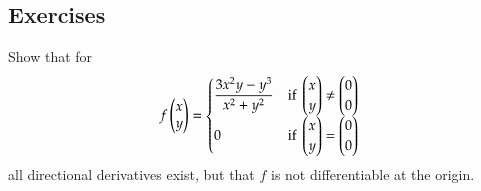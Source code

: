 \subsection{Exercises}
  Show that for
  \[f\begin{pmatrix} x \\ y \end{pmatrix} = \begin{cases}
  \displaystyle \frac{3x^2y - y^3}{x^2+y^2} & \text{if } \begin{pmatrix} x \\ y \end{pmatrix} \neq \begin{pmatrix} 0 \\ 0 \end{pmatrix} \\
  0 & \text{if } \begin{pmatrix} x \\ y \end{pmatrix} = \begin{pmatrix} 0 \\ 0 \end{pmatrix}
  \end{cases}\]
  all directional derivatives exist, but that $f$ is not differentiable at the origin.
